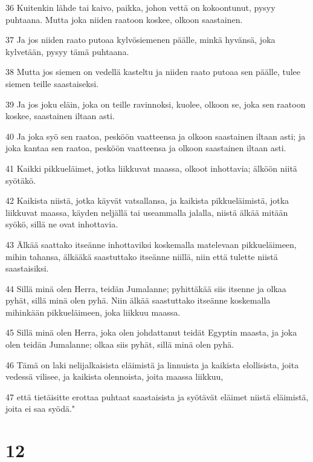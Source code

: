 \par 36 Kuitenkin lähde tai kaivo, paikka, johon vettä on kokoontunut, pysyy puhtaana. Mutta joka niiden raatoon koskee, olkoon saastainen.
\par 37 Ja jos niiden raato putoaa kylvösiemenen päälle, minkä hyvänsä, joka kylvetään, pysyy tämä puhtaana.
\par 38 Mutta jos siemen on vedellä kasteltu ja niiden raato putoaa sen päälle, tulee siemen teille saastaiseksi.
\par 39 Ja jos joku eläin, joka on teille ravinnoksi, kuolee, olkoon se, joka sen raatoon koskee, saastainen iltaan asti.
\par 40 Ja joka syö sen raatoa, pesköön vaatteensa ja olkoon saastainen iltaan asti; ja joka kantaa sen raatoa, pesköön vaatteensa ja olkoon saastainen iltaan asti.
\par 41 Kaikki pikkueläimet, jotka liikkuvat maassa, olkoot inhottavia; älköön niitä syötäkö.
\par 42 Kaikista niistä, jotka käyvät vatsallansa, ja kaikista pikkueläimistä, jotka liikkuvat maassa, käyden neljällä tai useammalla jalalla, niistä älkää mitään syökö, sillä ne ovat inhottavia.
\par 43 Älkää saattako itseänne inhottaviksi koskemalla matelevaan pikkueläimeen, mihin tahansa, älkääkä saastuttako itseänne niillä, niin että tulette niistä saastaisiksi.
\par 44 Sillä minä olen Herra, teidän Jumalanne; pyhittäkää siis itsenne ja olkaa pyhät, sillä minä olen pyhä. Niin älkää saastuttako itseänne koskemalla mihinkään pikkueläimeen, joka liikkuu maassa.
\par 45 Sillä minä olen Herra, joka olen johdattanut teidät Egyptin maasta, ja joka olen teidän Jumalanne; olkaa siis pyhät, sillä minä olen pyhä.
\par 46 Tämä on laki nelijalkaisista eläimistä ja linnuista ja kaikista elollisista, joita vedessä vilisee, ja kaikista olennoista, joita maassa liikkuu,
\par 47 että tietäisitte erottaa puhtaat saastaisista ja syötävät eläimet niistä eläimistä, joita ei saa syödä."

\chapter{12}

